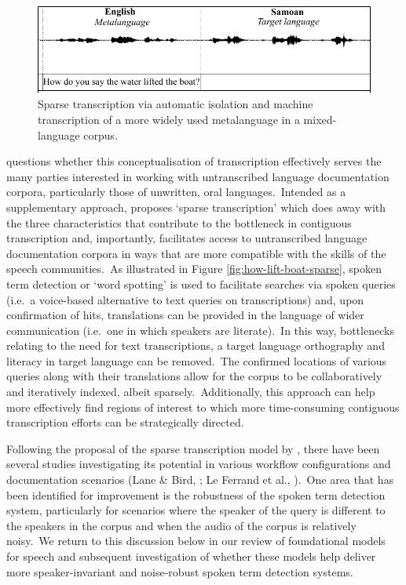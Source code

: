 \documentclass[main.tex]{subfiles}
\begin{document}
\begin{figure}[b]
  \centering
  \includegraphics[width=0.7\linewidth]{figures/intro-mixed-corpus.pdf}
  \caption{Sparse transcription via automatic isolation and machine transcription of a more widely used metalanguage in a mixed-language corpus.}
  \label{fig:mixed}
\end{figure}

\textcite{bird-2020-sparse} questions whether this conceptualisation of transcription effectively serves the many parties interested in working with untranscribed language documentation corpora, particularly those of unwritten, oral languages.~Intended as a supplementary approach, \textcite{bird-2020-sparse} proposes `sparse transcription' which does away with the three characteristics that contribute to the bottleneck in contiguous transcription and, importantly, facilitates access to untranscribed language documentation corpora in ways that are more compatible with the skills of the speech communities.~As illustrated in Figure \ref{fig:how-lift-boat-sparse}, spoken term detection or `word spotting' is used to facilitate searches via spoken queries (i.e.~a voice-based alternative to text queries on transcriptions) and, upon confirmation of hits, translations can be provided in the language of wider communication (i.e.~one in which speakers are literate).~In this way, bottlenecks relating to the need for text transcriptions, a target language orthography and literacy in target language can be removed.~The confirmed locations of various queries along with their translations allow for the corpus to be collaboratively and iteratively indexed, albeit sparsely.~Additionally, this approach can help more effectively find regions of interest to which more time-consuming contiguous transcription efforts can be strategically directed. 

Following the proposal of the sparse transcription model by \textcite{bird-2020-sparse}, there have been several studies investigating its potential in various workflow configurations and documentation scenarios (Lane \& Bird, \citeyear{lane2021local,lane2022finite}; Le Ferrand et al., \citeyear{leferrandEnablingInteractiveTranscription2020,le2021phone,le2022learning}).~One area that has been identified for improvement is the robustness of the spoken term detection system, particularly for scenarios where the speaker of the query is different to the speakers in the corpus and when the audio of the corpus is relatively noisy.~We return to this discussion below in our review of foundational models for speech and subsequent investigation of whether these models help deliver more speaker-invariant and noise-robust spoken term detection systems.
\end{document}
